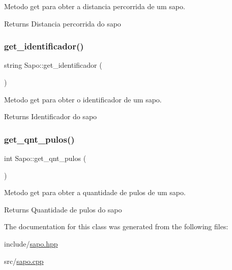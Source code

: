Metodo get para obter a distancia percorrida de um sapo. 

\begin{DoxyReturn}{Returns}
Distancia percorrida do sapo 
\end{DoxyReturn}
\mbox{\label{classSapo_a69ca03fd4c295dd95db85082f7494f91}} 
\subsubsection{\texorpdfstring{get\+\_\+identificador()}{get\_identificador()}}
{\footnotesize\ttfamily string Sapo\+::get\+\_\+identificador (\begin{DoxyParamCaption}{ }\end{DoxyParamCaption})}



Metodo get para obter o identificador de um sapo. 

\begin{DoxyReturn}{Returns}
Identificador do sapo 
\end{DoxyReturn}
\mbox{\label{classSapo_a9b37c7eae22e5a6a9e0a7f8d986a2f99}} 
\subsubsection{\texorpdfstring{get\+\_\+qnt\+\_\+pulos()}{get\_qnt\_pulos()}}
{\footnotesize\ttfamily int Sapo\+::get\+\_\+qnt\+\_\+pulos (\begin{DoxyParamCaption}{ }\end{DoxyParamCaption})}



Metodo get para obter a quantidade de pulos de um sapo. 

\begin{DoxyReturn}{Returns}
Quantidade de pulos do sapo 
\end{DoxyReturn}


The documentation for this class was generated from the following files\+:\begin{DoxyCompactItemize}
\item 
include/\hyperlink{sapo_8hpp}{sapo.\+hpp}\item 
src/\hyperlink{sapo_8cpp}{sapo.\+cpp}\end{DoxyCompactItemize}
